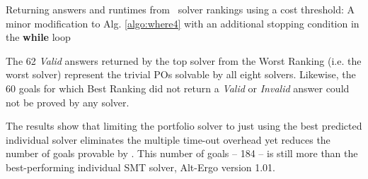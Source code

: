 \begin{algorithm}
	\caption{Returning answers and runtimes from \where~solver rankings using a cost threshold: A minor modification to Alg. \ref{algo:where4} with an additional stopping condition in the \textbf{while} loop}
	\label{algo:threshold}
	
\end{algorithm}

The 62 \textit{Valid} answers returned by the top solver from the \textsf{Worst Ranking} (i.e. the worst solver) represent the trivial POs solvable by all eight solvers. 
Likewise, the 60 goals for which \textsf{Best Ranking} did not return a \textit{Valid} or \textit{Invalid} answer could not be proved by any solver.

The results show that limiting the portfolio solver to just using the best predicted individual solver eliminates the multiple time-out overhead yet reduces the number of goals provable by \where.
This number of goals -- 184 -- is still more than the best-performing individual SMT solver, Alt-Ergo version 1.01.  

